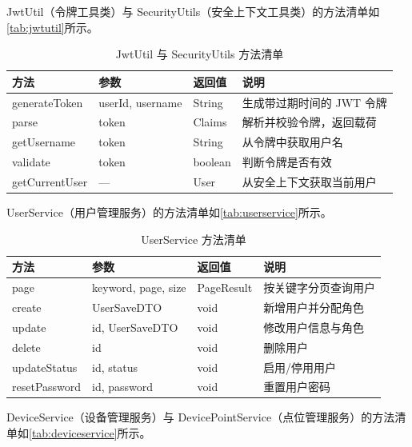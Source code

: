 \documentclass[12pt,hyperref,a4paper,UTF8]{ctexart}
\begin{document}
JwtUtil（令牌工具类）与 SecurityUtils（安全上下文工具类）的方法清单如\autoref{tab:jwtutil}所示。

\begin{table}[!htbp]
    \centering
    \caption{JwtUtil 与 SecurityUtils 方法清单}
    \label{tab:jwtutil}
    \begin{tabularx}{0.90\textwidth}{@{}L{3.2cm} L{3.4cm} L{2.3cm} Y@{}}
    \toprule
    \textbf{方法} & \textbf{参数} & \textbf{返回值} & \textbf{说明} \\
    \midrule
    generateToken & userId, username & String & 生成带过期时间的 JWT 令牌 \\
    parse & token & Claims & 解析并校验令牌，返回载荷 \\
    getUsername & token & String & 从令牌中获取用户名 \\
    validate & token & boolean & 判断令牌是否有效 \\
    getCurrentUser & — & User & 从安全上下文获取当前用户 \\
    \bottomrule
    \end{tabularx}
\end{table}

UserService（用户管理服务）的方法清单如\autoref{tab:userservice}所示。

\begin{table}[!htbp]
    \centering
    \caption{UserService 方法清单}
    \label{tab:userservice}
    \begin{tabularx}{0.90\textwidth}{@{}L{3.2cm} L{3.4cm} L{2.3cm} Y@{}}
    \toprule
    \textbf{方法} & \textbf{参数} & \textbf{返回值} & \textbf{说明} \\
    \midrule
    page & keyword, page, size & PageResult & 按关键字分页查询用户 \\
    create & UserSaveDTO & void & 新增用户并分配角色 \\
    update & id, UserSaveDTO & void & 修改用户信息与角色 \\
    delete & id & void & 删除用户 \\
    updateStatus & id, status & void & 启用/停用用户 \\
    resetPassword & id, password & void & 重置用户密码 \\
    \bottomrule
    \end{tabularx}
\end{table}

DeviceService（设备管理服务）与 DevicePointService（点位管理服务）的方法清单如\autoref{tab:deviceservice}所示。
\end{document}
